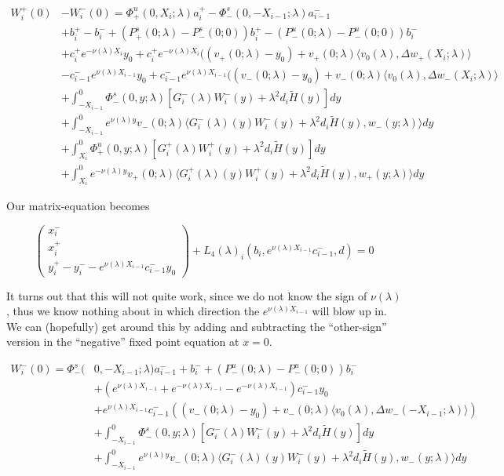\documentclass[12pt]{article}
\begin{document}
\begin{enumerate}
\begin{align*}
W_i^+(0) &- W_i^-(0) = \Phi^u_+(0, X_i; \lambda)a_i^+ - \Phi^s_-(0, -X_{i-1}; \lambda)a_{i-1}^- \\
&+ b_i^+ - b_i^- + (P^s_+(0; \lambda) - P^s_-(0; 0))b_i^+  - (P^u_-(0; \lambda) - P^u_-(0; 0))b_i^- \\
&+ c_i^+ e^{-\nu(\lambda)X_i} y_0 + c_i^+ e^{-\nu(\lambda)X_i}( (v_+(0; \lambda) - y_0) + v_+(0; \lambda) \langle v_0(\lambda), \Delta w_+(X_i; \lambda) \rangle\\
&- c_{i-1}^- e^{\nu(\lambda)X_{i-1}} y_0 + c_{i-1}^- e^{\nu(\lambda)X_{i-1}}( (v_-(0; \lambda) - y_0) + v_-(0; \lambda) \langle v_0(\lambda), \Delta w_-(X_i; \lambda) \rangle \\
&+ \int_{-X_{i-1}}^0 \Phi^s_-(0, y; \lambda) [ G_i^-(\lambda)W_i^-(y) + \lambda^2 d_i \tilde{H}(y) ] dy \\
&+ \int_{-X_{i-1}}^0
e^{\nu(\lambda)y} v_-(0; \lambda) \langle G_i^-(\lambda)(y)W_i^-(y) + \lambda^2 d_i \tilde{H}(y), w_-(y; \lambda) \rangle dy \\
&+ \int_{X_i}^0 \Phi^u_+(0, y; \lambda) [ G_i^+(\lambda)W_i^+(y) + \lambda^2 d_i \tilde{H}(y) ] dy \\
&+ \int_{X_i}^0 e^{-\nu(\lambda)y} v_+(0; \lambda) \langle G_i^+(\lambda)(y)W_i^+(y) + \lambda^2 d_i \tilde{H}(y), w_+(y; \lambda) \rangle dy
\end{align*}

Our matrix-equation becomes

\[
\begin{pmatrix}x_i^- \\ x_i^+ \\ y_i^+ - y_i^- - e^{\nu(\lambda)X_{i-1}} c_{i-1}^- y_0 \end{pmatrix} + L_4(\lambda)_i(b_i, e^{\nu(\lambda)X_{i-1}} c_{i-1}^-, d) = 0
\]

It turns out that this will not quite work, since we do not know the sign of $\nu(\lambda)$, thus we know nothing about in which direction the $e^{\nu(\lambda)X_{i-1}}$ will blow up in. We can (hopefully) get around this by adding and subtracting the ``other-sign'' version in the ``negative'' fixed point equation at $x = 0$.

\begin{align*}
W_i^-(0) = \Phi^s_-(&0, -X_{i-1}; \lambda)a_{i-1}^- + b_i^- + (P^u_-(0; \lambda) - P^u_-(0; 0))b_i^- \\
&+ (e^{\nu(\lambda)X_{i-1}} + e^{-\nu(\lambda)X_{i-1}} - e^{-\nu(\lambda)X_{i-1}}) c_{i-1}^- y_0 \\
&+ e^{\nu(\lambda)X_{i-1}} c_{i-1}^- ( (v_-(0; \lambda) - y_0) + v_-(0; \lambda) \langle  v_0(\lambda), \Delta w_-(-X_{i-1}; \lambda) \rangle) \\
&+ \int_{-X_{i-1}}^0 \Phi^s_-(0, y; \lambda) [ G_i^-(\lambda)W_i^-(y) + \lambda^2 d_i \tilde{H}(y) ] dy \\
&+ \int_{-X_{i-1}}^0
e^{\nu(\lambda)y} v_-(0; \lambda) \langle G_i^-(\lambda)(y)W_i^-(y) + \lambda^2 d_i \tilde{H}(y), w_-(y; \lambda) \rangle dy
\end{align*}


\end{enumerate}
\end{document}
